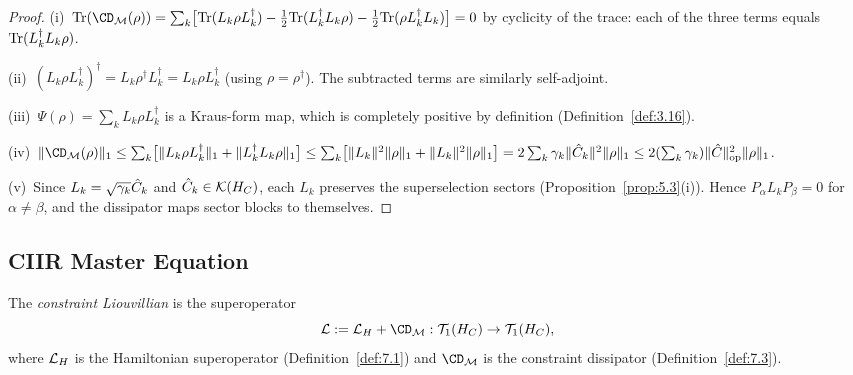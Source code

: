 \begin{proof}
(i)~$\Tr(\CD_\CM(\rho)) =
\sum_k \bigl[\Tr(L_k\rho L_k^\dagger) -
\frac{1}{2}\Tr(L_k^\dagger L_k\rho) -
\frac{1}{2}\Tr(\rho L_k^\dagger L_k)\bigr] = 0$
by cyclicity of the trace: each of the three terms equals
$\mathrm{Tr}(L_k^\dagger L_k\rho)$.

(ii)~$(L_k\rho L_k^\dagger)^\dagger = L_k\rho^\dagger L_k^\dagger =
L_k\rho L_k^\dagger$ (using $\rho = \rho^\dagger$).  The subtracted
terms are similarly self-adjoint.

(iii)~$\Psi(\rho) = \sum_k L_k\rho L_k^\dagger$ is a Kraus-form
map, which is completely positive by definition
(Definition~\ref{def:3.16}).

(iv)~$\|\CD_\CM(\rho)\|_1 \leq \sum_k \bigl[
\|L_k\rho L_k^\dagger\|_1 + \|L_k^\dagger L_k\rho\|_1\bigr]
\leq \sum_k \bigl[\|L_k\|^2\|\rho\|_1 + \|L_k\|^2\|\rho\|_1\bigr]
= 2\sum_k \gamma_k\|\hatC_k\|^2\|\rho\|_1
\leq 2(\sum_k \gamma_k)\|\hatC\|_{\mathrm{op}}^2\|\rho\|_1$.

(v)~Since $L_k = \sqrt{\gamma_k}\hat{C}_k$ and $\hat{C}_k \in \mathcal{K}(H_C)$,
each $L_k$ preserves the superselection sectors
(Proposition~\ref{prop:5.3}(i)).  Hence
$P_\alpha L_k P_\beta = 0$ for $\alpha \neq \beta$, and the
dissipator maps sector blocks to themselves.
\end{proof}

\subsection{CIIR Master Equation}
\label{sec:ch7:master}

\begin{definition}
\label{def:7.4}
The \emph{constraint Liouvillian} is the superoperator
\[
  \CL := \CL_H + \CD_\CM :
  \mathcal{T}_1(\HC) \to \mathcal{T}_1(\HC),
\]
where $\mathcal{L}_H$ is the Hamiltonian superoperator
\textup{(}Definition~\textup{\ref{def:7.1})} and $\CD_\CM$ is the
constraint dissipator \textup{(}Definition~\textup{\ref{def:7.3})}.
\end{definition}

